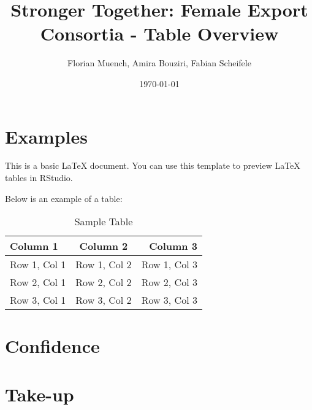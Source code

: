 \documentclass{article}
\begin{document}
\title{Stronger Together: Female Export Consortia - Table Overview}
\author{Florian Muench, Amira Bouziri, Fabian Scheifele}
\date{\today}

\maketitle

\section{Examples}

This is a basic LaTeX document. You can use this template to preview LaTeX tables in RStudio.

Below is an example of a table:

\begin{table}[h]
    \centering
    \caption{Sample Table}
    \begin{tabular}{l c r}
        \toprule
        Column 1 & Column 2 & Column 3 \\
        \midrule
        Row 1, Col 1 & Row 1, Col 2 & Row 1, Col 3 \\
        Row 2, Col 1 & Row 2, Col 2 & Row 2, Col 3 \\
        Row 3, Col 1 & Row 3, Col 2 & Row 3, Col 3 \\
        \bottomrule
    \end{tabular}
\end{table}

\section{Confidence}

%

\section{Take-up}


\end{document}
